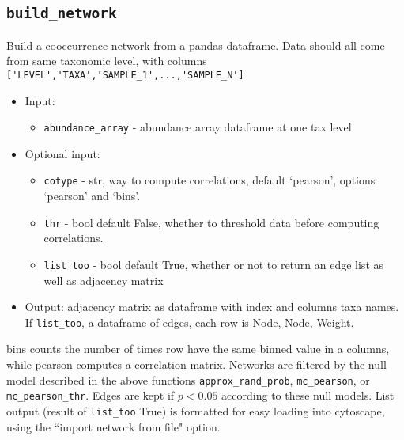 \documentclass[10pt]{article}
\theoremstyle{definition}
\numberwithin{theorem}{section}
\numberwithin{definition}{section}
\numberwithin{lemma}{section}
\numberwithin{corollary}{section}
\numberwithin{clm}{section}
\numberwithin{rmk}{section}
\begin{document}
\cprotect \subsection{\verb|build_network|}
Build a cooccurrence network from a pandas dataframe. Data should all come from same taxonomic level, with columns
\verb|['LEVEL','TAXA','SAMPLE_1',...,'SAMPLE_N']|
\begin{itemize}
	\item Input: 
	\begin{itemize}
		\item \verb|abundance_array| - abundance array dataframe at one tax level
	\end{itemize}
	\item Optional input: 
	\begin{itemize}
		\item \verb|cotype| - str, way to compute correlations, default `pearson', options `pearson' and `bins'.
		\item \verb|thr| - bool default False, whether to threshold data before computing correlations.
		\item \verb|list_too| - bool default True, whether or not to return an edge list as well as adjacency matrix
	\end{itemize}
	\item Output: adjacency matrix as dataframe with index and columns taxa names. If \verb|list_too|, a dataframe of edges, each row is Node, Node, Weight.
\end{itemize}

bins counts the number of times row have the same binned value in a columns, while pearson computes a correlation matrix. Networks are filtered by the null model described in the above functions \verb|approx_rand_prob|, \verb|mc_pearson|, or \verb|mc_pearson_thr|. Edges are kept if $p< 0.05$ according to these null models. List output (result of \verb|list_too| True) is formatted for easy loading into cytoscape, using the ``import network from file" option.
\end{document}
